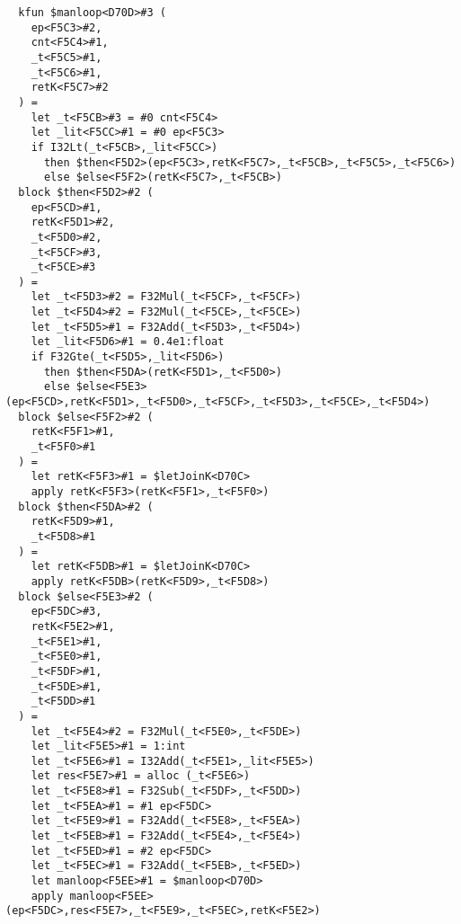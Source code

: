 \documentclass[11pt]{article}
\begin{document}
\begin{lstlisting}
  kfun $manloop<D70D>#3 (
    ep<F5C3>#2,
    cnt<F5C4>#1,
    _t<F5C5>#1,
    _t<F5C6>#1,
    retK<F5C7>#2
  ) =
    let _t<F5CB>#3 = #0 cnt<F5C4>
    let _lit<F5CC>#1 = #0 ep<F5C3>
    if I32Lt(_t<F5CB>,_lit<F5CC>)
      then $then<F5D2>(ep<F5C3>,retK<F5C7>,_t<F5CB>,_t<F5C5>,_t<F5C6>)
      else $else<F5F2>(retK<F5C7>,_t<F5CB>)
  block $then<F5D2>#2 (
    ep<F5CD>#1,
    retK<F5D1>#2,
    _t<F5D0>#2,
    _t<F5CF>#3,
    _t<F5CE>#3
  ) =
    let _t<F5D3>#2 = F32Mul(_t<F5CF>,_t<F5CF>)
    let _t<F5D4>#2 = F32Mul(_t<F5CE>,_t<F5CE>)
    let _t<F5D5>#1 = F32Add(_t<F5D3>,_t<F5D4>)
    let _lit<F5D6>#1 = 0.4e1:float
    if F32Gte(_t<F5D5>,_lit<F5D6>)
      then $then<F5DA>(retK<F5D1>,_t<F5D0>)
      else $else<F5E3>(ep<F5CD>,retK<F5D1>,_t<F5D0>,_t<F5CF>,_t<F5D3>,_t<F5CE>,_t<F5D4>)
  block $else<F5F2>#2 (
    retK<F5F1>#1,
    _t<F5F0>#1
  ) =
    let retK<F5F3>#1 = $letJoinK<D70C>
    apply retK<F5F3>(retK<F5F1>,_t<F5F0>)
  block $then<F5DA>#2 (
    retK<F5D9>#1,
    _t<F5D8>#1
  ) =
    let retK<F5DB>#1 = $letJoinK<D70C>
    apply retK<F5DB>(retK<F5D9>,_t<F5D8>)
  block $else<F5E3>#2 (
    ep<F5DC>#3,
    retK<F5E2>#1,
    _t<F5E1>#1,
    _t<F5E0>#1,
    _t<F5DF>#1,
    _t<F5DE>#1,
    _t<F5DD>#1
  ) =
    let _t<F5E4>#2 = F32Mul(_t<F5E0>,_t<F5DE>)
    let _lit<F5E5>#1 = 1:int
    let _t<F5E6>#1 = I32Add(_t<F5E1>,_lit<F5E5>)
    let res<F5E7>#1 = alloc (_t<F5E6>)
    let _t<F5E8>#1 = F32Sub(_t<F5DF>,_t<F5DD>)
    let _t<F5EA>#1 = #1 ep<F5DC>
    let _t<F5E9>#1 = F32Add(_t<F5E8>,_t<F5EA>)
    let _t<F5EB>#1 = F32Add(_t<F5E4>,_t<F5E4>)
    let _t<F5ED>#1 = #2 ep<F5DC>
    let _t<F5EC>#1 = F32Add(_t<F5EB>,_t<F5ED>)
    let manloop<F5EE>#1 = $manloop<D70D>
    apply manloop<F5EE>(ep<F5DC>,res<F5E7>,_t<F5E9>,_t<F5EC>,retK<F5E2>)
\end{lstlisting}
\end{document}
